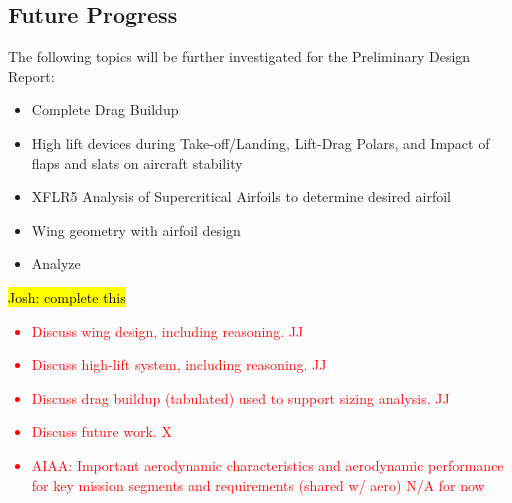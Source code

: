 \subsection{Future Progress}
The following topics will be further investigated for the Preliminary Design Report:
\begin{itemize}
    \item Complete Drag Buildup
    \item High lift devices during Take-off/Landing, Lift-Drag Polars, and Impact of flaps and slats on aircraft stability
    \item XFLR5 Analysis of Supercritical Airfoils to determine desired airfoil
    \item Wing geometry with airfoil design
    \item Analyze 
\end{itemize}

\hl{Josh: complete this}


\textcolor{red}{
\begin{itemize}
    \item Discuss wing design, including reasoning. \checkmark JJ
    \item Discuss high-lift system, including reasoning. \checkmark JJ
    \item Discuss drag buildup (tabulated) used to support sizing analysis. \checkmark JJ
    \item Discuss future work. X
    \item AIAA: Important aerodynamic characteristics and aerodynamic performance for key mission
    segments and requirements (shared w/ aero) N/A for now \checkmark
\end{itemize}}